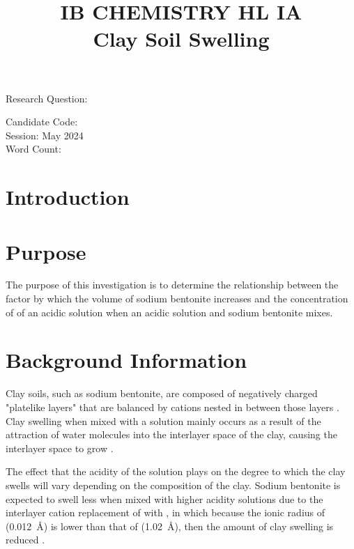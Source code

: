 \documentclass[11pt, letterpaper]{article}
\title{IB CHEMISTRY HL IA
\\
Clay Soil Swelling}
\author{}
\date{}
\begin{document}
\nocite{*}

\maketitle

\begin{center}
    Research Question:
    \\
\end{center}

\begin{center}
    Candidate Code:
    \\
    Session: May 2024
    \\
    Word Count:
\end{center}
\newpage

\tableofcontents
\newpage


\section{Introduction}
\setcounter{page}{1}

\section{Purpose}

The purpose of this investigation is to determine the relationship between
the factor by which the volume of
sodium bentonite increases and the concentration of  of an acidic solution when an acidic solution and sodium bentonite
mixes.

\section{Background Information}

Clay soils, such as sodium bentonite, are composed of negatively charged
"platelike layers" that are balanced by cations nested in between
those layers \cite{chenClaySwellingRole2022}. Clay swelling when mixed with a solution mainly occurs
as a result of the attraction of water molecules into the interlayer space
of the clay, causing the interlayer space to grow \cite{chenClaySwellingRole2022}.

The effect that the acidity of the solution plays on the degree to which
the clay swells will vary depending on the composition of the clay.
Sodium bentonite is expected to swell less when mixed with higher acidity
solutions due to the interlayer cation replacement
of  with , in which because the
ionic radius of  (\SI{0.012}{\angstrom})
is lower than that of  (\SI{1.02}{\angstrom}),
then the amount of clay swelling is reduced \cite{ramavaraprasadSwellingCharacteristicsSoils2018a}.
\end{document}
